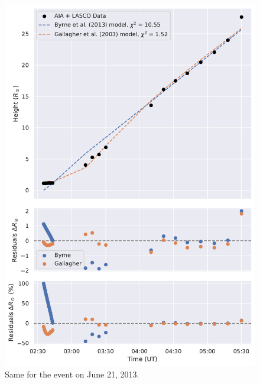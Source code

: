 \begin{figure}[!htp]
	\centering
	\includegraphics[width=0.8\hsize]{chapter2/figs/appendix/height_profile_residuals_aia_lasco_130621_01.pdf}
	\caption{Same for the event on June 21, 2013.}
\end{figure}

